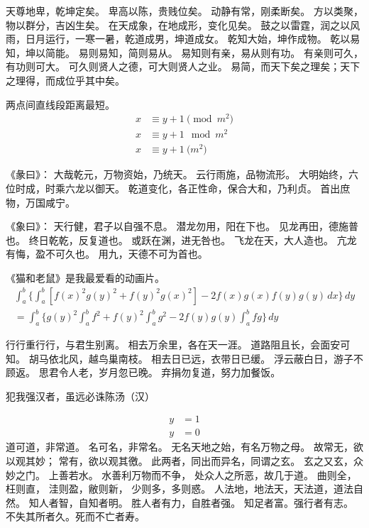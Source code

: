 天尊地卑，乾坤定矣。
卑高以陈，贵贱位矣。
动静有常，刚柔断矣。
方以类聚，物以群分，吉凶生矣。
在天成象，在地成形，变化见矣。
鼓之以雷霆，润之以风雨，日月运行，一寒一暑，乾道成男，坤道成女。
乾知大始，坤作成物。
乾以易知，坤以简能。
易则易知，简则易从。
易知则有亲，易从则有功。
有亲则可久，有功则可大。
可久则贤人之德，可大则贤人之业。
易简，而天下矣之理矣；天下之理得，而成位乎其中矣。

\begin{axiom}
两点间直线段距离最短。  
\begin{align}
x&\equiv y+1\pmod{m^2}\\
x&\equiv y+1\mod{m^2}\\
x&\equiv y+1\pod{m^2}
\end{align}
\end{axiom}

《彖曰》：
大哉乾元，万物资始，乃统天。
云行雨施，品物流形。
大明始终，六位时成，时乘六龙以御天。
乾道变化，各正性命，保合大和，乃利贞。
首出庶物，万国咸宁。

《象曰》：
天行健，君子以自强不息。
潜龙勿用，阳在下也。
见龙再田，德施普也。
终日乾乾，反复道也。
或跃在渊，进无咎也。
飞龙在天，大人造也。
亢龙有悔，盈不可久也。
用九，天德不可为首也。 　　

\begin{lemma}
《猫和老鼠》是我最爱看的动画片。
\begin{multline*}%
\int_a^b\biggl\{\int_a^b[f(x)^2g(y)^2+f(y)^2g(x)^2]
 -2f(x)g(x)f(y)g(y)\,dx\biggr\}\,dy \\
 =\int_a^b\biggl\{g(y)^2\int_a^bf^2+f(y)^2
  \int_a^b g^2-2f(y)g(y)\int_a^b fg\biggr\}\,dy
\end{multline*}
\end{lemma}

行行重行行，与君生别离。
相去万余里，各在天一涯。
道路阻且长，会面安可知。
胡马依北风，越鸟巢南枝。
相去日已远，衣带日已缓。
浮云蔽白日，游子不顾返。
思君令人老，岁月忽已晚。
弃捐勿复道，努力加餐饭。

\begin{theorem}\label{the:theorem1}
犯我强汉者，虽远必诛\hfill \pozhehao 陈汤（汉）
\end{theorem}
\begin{subequations}
\begin{align}
y & = 1 \\
y & = 0
\end{align}
\end{subequations}
道可道，非常道。
名可名，非常名。
无名天地之始，有名万物之母。
故常无，欲以观其妙；
常有，欲以观其徼。
此两者，同出而异名，同谓之玄。
玄之又玄，众妙之门。
上善若水。
水善利万物而不争，
处众人之所恶，故几于道。
曲则全，枉则直，
洼则盈，敝则新，
少则多，多则惑。
人法地，地法天，天法道，道法自然。
知人者智，自知者明。
胜人者有力，自胜者强。
知足者富。强行者有志。
不失其所者久。死而不亡者寿。

